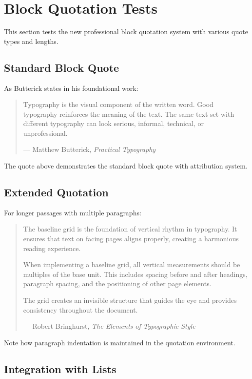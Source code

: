 \documentclass[11pt,a4paper]{article}
\begin{document}
\section{Block Quotation Tests}

This section tests the new professional block quotation system with various quote types and lengths.

\subsection{Standard Block Quote}

As Butterick states in his foundational work:
\begin{quote}
Typography is the visual component of the written word. Good typography reinforces the meaning of the text. The same text set with different typography can look serious, informal, technical, or unprofessional.

\hfill--- Matthew Butterick, \textit{Practical Typography}
\end{quote}

The quote above demonstrates the standard block quote with attribution system.

\subsection{Extended Quotation}

For longer passages with multiple paragraphs:
\begin{quotation}
The baseline grid is the foundation of vertical rhythm in typography. It ensures that text on facing pages aligns properly, creating a harmonious reading experience.

When implementing a baseline grid, all vertical measurements should be multiples of the base unit. This includes spacing before and after headings, paragraph spacing, and the positioning of other page elements.

The grid creates an invisible structure that guides the eye and provides consistency throughout the document.

\hfill--- Robert Bringhurst, \textit{The Elements of Typographic Style}
\end{quotation}

Note how paragraph indentation is maintained in the quotation environment.

\subsection{Integration with Lists}
\end{document}
